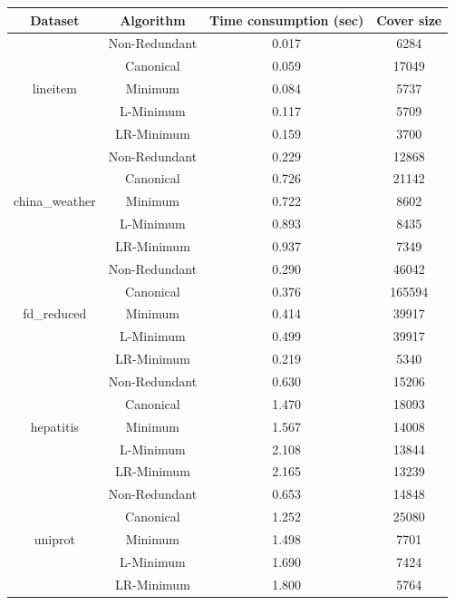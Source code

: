 \documentclass[11pt]{book}
\begin{document}
\begin{table}[H]

	\centering
	
\begin{tabular}{|c|c|c|c|}

    \hline
    Dataset & Algorithm & Time consumption (sec) & Cover size \\
    
    \hline
    \multirow{5}{*}{lineitem}
    	& Non-Redundant & 0.017 & 6284  \\
    	& Canonical     & 0.059 & 17049 \\
    	& Minimum       & 0.084 & 5737  \\
    	& L-Minimum     & 0.117 & 5709  \\
    	& LR-Minimum    & 0.159 & 3700  \\
    
    \hline
    \multirow{5}{*}{china\_weather}
    	& Non-Redundant & 0.229 & 12868 \\
    	& Canonical     & 0.726 & 21142 \\
    	& Minimum       & 0.722 & 8602  \\
    	& L-Minimum     & 0.893 & 8435  \\
    	& LR-Minimum    & 0.937 & 7349  \\    	

    \hline
    \multirow{5}{*}{fd\_reduced}
    	& Non-Redundant & 0.290 & 46042  \\
    	& Canonical     & 0.376 & 165594 \\
    	& Minimum       & 0.414 & 39917  \\
    	& L-Minimum     & 0.499 & 39917  \\
    	& LR-Minimum    & 0.219 & 5340   \\

    \hline
    \multirow{5}{*}{hepatitis}
    	& Non-Redundant & 0.630 & 15206  \\
    	& Canonical     & 1.470 & 18093  \\
    	& Minimum       & 1.567 & 14008  \\
    	& L-Minimum     & 2.108 & 13844  \\
    	& LR-Minimum    & 2.165 & 13239  \\

    \hline
    \multirow{5}{*}{uniprot}
    	& Non-Redundant & 0.653 & 14848  \\
    	& Canonical     & 1.252 & 25080  \\
    	& Minimum       & 1.498 & 7701   \\
    	& L-Minimum     & 1.690 & 7424   \\
    	& LR-Minimum    & 1.800 & 5764   \\


\end{tabular}
\end{table}
\end{document}
